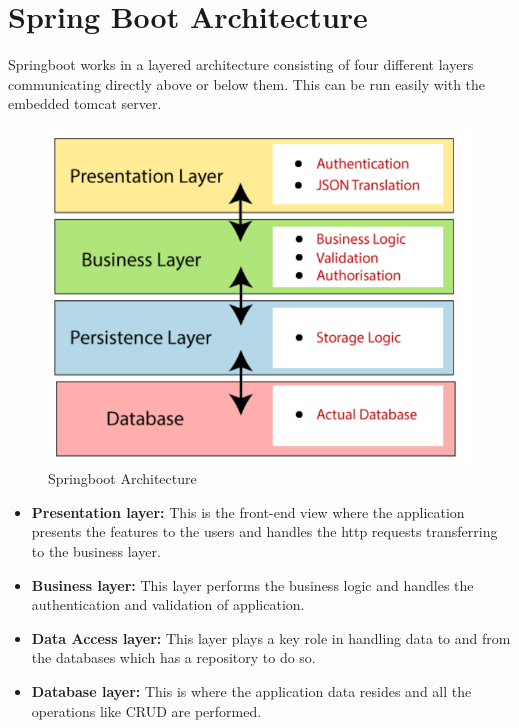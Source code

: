\section{Spring Boot Architecture}
    Springboot works in a layered architecture consisting of four different layers communicating directly above or below them. This can be run easily with the embedded tomcat server.
     \begin{figure}[h!]
    \begin{center}
          \includegraphics[scale=1]{images/springboot.PNG}
            \centering \caption{Springboot Architecture}
    \end{center}
    \end{figure}
    \begin{itemize}
        \item  \textbf{Presentation layer:} This is the front-end view where the application presents the features to the users and handles the http requests transferring to the business layer.
        \item  \textbf{Business layer:} This layer performs the business logic and handles the authentication and validation of application.
        \item  \textbf{Data Access layer:} This layer plays a key role in handling data to and from the databases which has a repository to do so.
        \item  \textbf{Database layer:} This is where the application data resides and all the operations like CRUD are performed\cite{www.javatpoint.com}.
  \end{itemize}
